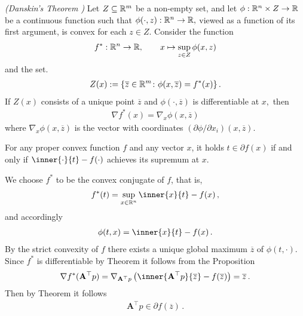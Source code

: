 \begin{proposition*}
  \emph{(Danskin's Theorem \cite[page 649]{Bertsekas2003})}
  Let 
  $
    Z \subseteq \mathbb{R}^m
  $
  be a non-empty set, 
  and let 
  $
    \phi :
    \mathbb{R}^n \times Z \to \mathbb{R}
  $
  be a continuous function such that
  $
    \phi(\cdot,z)
    :
    \mathbb{R}^n \to \mathbb{R},
  $
  viewed as a function of its first argument, 
  is convex for each 
  $
    z \in Z.
  $
  Consider the function
  \begin{gather}
    f^*:\mathbb{R}^n \to \mathbb{R}
    ,
    \qquad
    x\mapsto
    \sup_{z\in Z}
    \phi(x,z)
  \end{gather}
  and
  the set.
  \begin{gather}
    Z(x)
    :=
    \left\{ 
      \overline{z} \in \mathbb{R}^m
      \colon
      \phi(x, \overline{z})
      =
      f^*(x)
  \right\}
  .
  \end{gather}
  If $Z(x)$ consists of a unique point 
  $\overline{z}$
  and
  $
    \phi(\cdot, \overline{z})
  $
  is differentiable at $x,$
  then
  \begin{gather}
    \nabla f^*(x)
    =
    \nabla_x
    \phi(x,\overline{z})
  \end{gather}
  where 
  $
    \nabla_x
    \phi(x,\overline{z})
  $
  is the vector with coordinates
  $
    (\partial \phi / \partial x_i)
    (x,\overline{z})
  $.
\end{proposition*}
\begin{theorem*}
   For any proper convex function $f$ and any vector $x$, 
   it holds $t\in \partial f(x)$ 
   if and only if 
   $
   \inner
   {\cdot}{t}
   -
   f(\cdot)
   $
   achieves its supremum at $x$.
\end{theorem*}
\begin{example*}
  We choose $f^*$ to be the convex conjugate of $f$, that is,
  \begin{gather}
    f^*(t)
    =
    \sup_{x\in\R^n}
    \inner{x}{t}-f(x)
    \,,
  \end{gather}
  and accordingly
  \begin{gather}
    \phi
    (t,x)
    =
    \inner{x}{t}-f(x)
    \,.
  \end{gather}
  By the strict convexity of $f$ there exists a unique
  global maximum $\overline{z}$ of $\phi(t,\cdot)$. 
  Since $f^*$ is differentiable by Theorem
  it follows from the Proposition
  \begin{gather}
    \nabla f^*(\mathbf{A}^\top p)
    =
    \nabla_{\mathbf{A}^\top p}
\left( 
    \inner
    {
      \mathbf{A}^\top p
    }
    {
      \overline{z}
    }
    -
    f
    (
      \overline{z}
    )
\right)
=
      \overline{z}
      \,.
  \end{gather}
  Then by Theorem it follows
\begin{gather}
  \mathbf{A}^\top p
  \in 
  \partial
    f
    (
      \overline{z}
    )
  \,.
\end{gather}
\end{example*}

